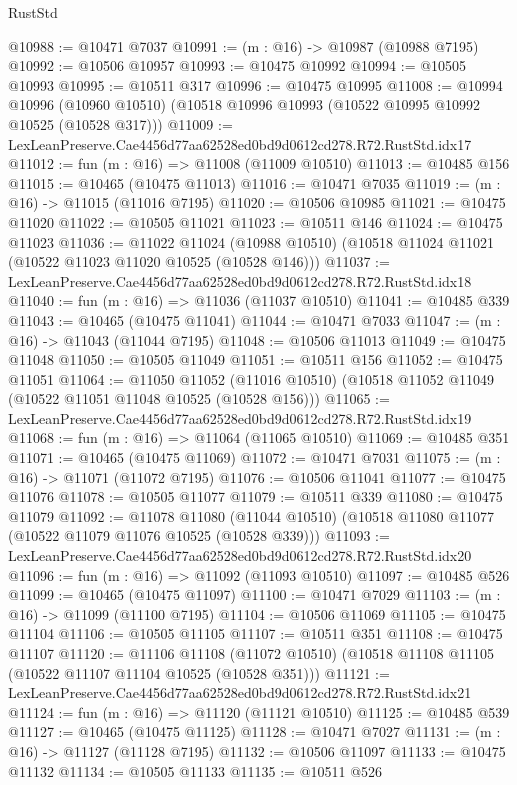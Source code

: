 \begin{lexlean}{RustStd}
\begin{coremodule}
@10988 := @10471 @7037
@10991 := (m : @16) -> @10987 (@10988 @7195)
@10992 := @10506 @10957
@10993 := @10475 @10992
@10994 := @10505 @10993
@10995 := @10511 @317
@10996 := @10475 @10995
@11008 := @10994
    @10996
    (@10960 @10510)
    (@10518 @10996 @10993 (@10522 @10995 @10992 @10525 (@10528 @317)))
@11009 := LexLeanPreserve.Cae4456d77aa62528ed0bd9d0612cd278.R72.RustStd.idx17
@11012 := fun (m : @16) => @11008 (@11009 @10510)
@11013 := @10485 @156
@11015 := @10465 (@10475 @11013)
@11016 := @10471 @7035
@11019 := (m : @16) -> @11015 (@11016 @7195)
@11020 := @10506 @10985
@11021 := @10475 @11020
@11022 := @10505 @11021
@11023 := @10511 @146
@11024 := @10475 @11023
@11036 := @11022
    @11024
    (@10988 @10510)
    (@10518 @11024 @11021 (@10522 @11023 @11020 @10525 (@10528 @146)))
@11037 := LexLeanPreserve.Cae4456d77aa62528ed0bd9d0612cd278.R72.RustStd.idx18
@11040 := fun (m : @16) => @11036 (@11037 @10510)
@11041 := @10485 @339
@11043 := @10465 (@10475 @11041)
@11044 := @10471 @7033
@11047 := (m : @16) -> @11043 (@11044 @7195)
@11048 := @10506 @11013
@11049 := @10475 @11048
@11050 := @10505 @11049
@11051 := @10511 @156
@11052 := @10475 @11051
@11064 := @11050
    @11052
    (@11016 @10510)
    (@10518 @11052 @11049 (@10522 @11051 @11048 @10525 (@10528 @156)))
@11065 := LexLeanPreserve.Cae4456d77aa62528ed0bd9d0612cd278.R72.RustStd.idx19
@11068 := fun (m : @16) => @11064 (@11065 @10510)
@11069 := @10485 @351
@11071 := @10465 (@10475 @11069)
@11072 := @10471 @7031
@11075 := (m : @16) -> @11071 (@11072 @7195)
@11076 := @10506 @11041
@11077 := @10475 @11076
@11078 := @10505 @11077
@11079 := @10511 @339
@11080 := @10475 @11079
@11092 := @11078
    @11080
    (@11044 @10510)
    (@10518 @11080 @11077 (@10522 @11079 @11076 @10525 (@10528 @339)))
@11093 := LexLeanPreserve.Cae4456d77aa62528ed0bd9d0612cd278.R72.RustStd.idx20
@11096 := fun (m : @16) => @11092 (@11093 @10510)
@11097 := @10485 @526
@11099 := @10465 (@10475 @11097)
@11100 := @10471 @7029
@11103 := (m : @16) -> @11099 (@11100 @7195)
@11104 := @10506 @11069
@11105 := @10475 @11104
@11106 := @10505 @11105
@11107 := @10511 @351
@11108 := @10475 @11107
@11120 := @11106
    @11108
    (@11072 @10510)
    (@10518 @11108 @11105 (@10522 @11107 @11104 @10525 (@10528 @351)))
@11121 := LexLeanPreserve.Cae4456d77aa62528ed0bd9d0612cd278.R72.RustStd.idx21
@11124 := fun (m : @16) => @11120 (@11121 @10510)
@11125 := @10485 @539
@11127 := @10465 (@10475 @11125)
@11128 := @10471 @7027
@11131 := (m : @16) -> @11127 (@11128 @7195)
@11132 := @10506 @11097
@11133 := @10475 @11132
@11134 := @10505 @11133
@11135 := @10511 @526

\end{coremodule}
\end{lexlean}
